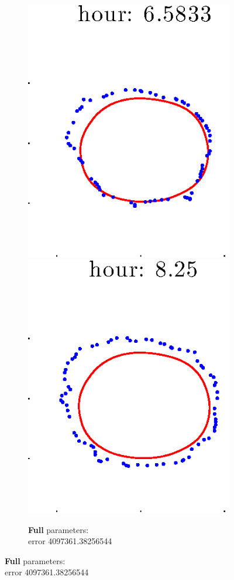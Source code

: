 \documentclass[12pt]{article}
\begin{document}
\begin{figure}[h!]
\begin{subfigure}[b]{.3\textwidth}
		\includegraphics[height=.15\textheight]{Pos10exp2/full/full5.eps}
		\includegraphics[height=.15\textheight]{Pos10exp2/full/full6.eps}
		\caption{\textbf{Full} parameters: \\error 4097361.38256544}

\end{subfigure}
\end{figure}
\end{document}

